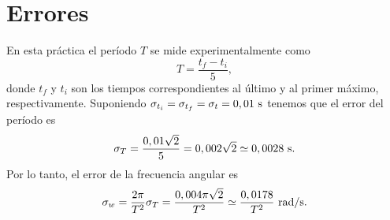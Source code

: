 
\newpage
\section{Errores}

En esta pr\'actica el per\'iodo $T$ se mide experimentalmente como
%
\begin{equation*}
  T = \frac{t_f - t_i}{5},
\end{equation*}
%
donde $t_f$ y $t_i$ son los tiempos correspondientes al \'ultimo y al primer m\'aximo, respectivamente. Suponiendo $\sigma_{t_i} = \sigma_{t_f} = \sigma_t = 0,01~{\rm s}$ tenemos que el error del per\'iodo es
%
\begin{equation*}
\sigma_T = \frac{0,01\sqrt{2}}{5} = 0,002\sqrt{2} \simeq 0,0028~{\rm s}.
\end{equation*}
%
Por lo tanto, el error de la frecuencia angular es
%
\begin{equation*}
\sigma_w = \frac{2\pi}{T^2}\sigma_T = \frac{0,004\pi\sqrt{2}}{T^2} \simeq \frac{0,0178}{T^2}~{\rm rad/s}.
\end{equation*}
